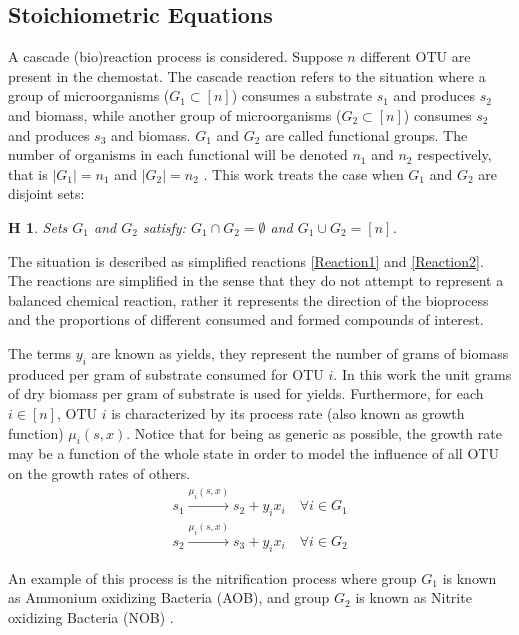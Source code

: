 \documentclass[3p,times]{article}
\newtheorem{hypo}{H}
\begin{document}
\subsection{Stoichiometric Equations}
A cascade (bio)reaction process is considered. Suppose $n$ different OTU are present in the chemostat. The cascade reaction refers to the situation where a group of microorganisms ($G_1 \subset [n] $) consumes a substrate $s_1$ and produces $s_2$ and biomass, while another group of microorganisms ($G_2\subset [n]$) consumes $s_2$ and produces $s_3$ and biomass. $G_1$ and $G_2$ are called functional groups. The number of organisms in each functional will be denoted $n_1$ and $n_2$ respectively, that is $\vert G_1 \vert = n_1$ and $\vert G_2 \vert = n_2$ . This work treats the case when $G_1$ and $G_2$ are disjoint sets:

\begin{hypo}  Sets $G_1$ and $G_2$ satisfy: $G_1 \cap G_2 = \emptyset$ and $G_1 \cup G_2 = [n]$. 
\end{hypo}

The situation is described as simplified reactions \eqref{Reaction1} and \eqref{Reaction2}. The reactions are simplified in the sense that they do not attempt to represent a balanced chemical reaction, rather it represents the direction of the bioprocess and the proportions of different consumed and formed compounds of interest. 

The terms $y_i$ are known as yields, they represent the number of grams of biomass produced per gram of substrate consumed for OTU $i$. In this work the unit grams of dry biomass per gram of substrate is used for yields. Furthermore, for each $ i \in [n]$, OTU $i$ is characterized by its process rate (also known as growth function) $\mu_i(s,x)$. Notice that for being as generic as possible, the growth rate may be a function of the whole state in order to model the influence of all OTU on the growth rates of others.
\begin{align}
\label{Reaction1} \tag{R G1} 	s_1 \stackrel{\mu_i(s,x)}{\longrightarrow} s_2 + y_ix_i \quad \forall i \in G_1 \\
\label{Reaction2} \tag{R G2} s_2\stackrel{\mu_i(s,x)}{\longrightarrow} s_3 + y_ix_i \quad \forall i \in G_2
\end{align}

An example of this process is the nitrification process where group $G_1$ is known as Ammonium oxidizing Bacteria (AOB), and group $G_2$ is known as Nitrite oxidizing Bacteria (NOB) \cite{SHARMA1977897}.
\end{document}
